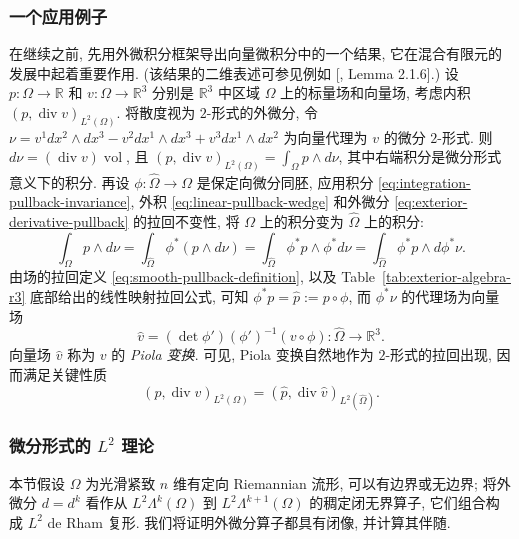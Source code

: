 \subsubsection{{一个应用例子}}\label{subsec:piola-application}

{在继续之前, 先用外微积分框架导出向量微积分中的一个结果, 它在混合有限元的发展中起着重要作用. (该结果的二维表述可参见例如 [, Lemma 2.1.6].) 设 $p:\Omega\to\mathbb R$ 和 $v:\Omega\to\mathbb R^3$ 分别是 $\mathbb R^3$ 中区域 $\Omega$ 上的标量场和向量场, 考虑内积 $(p,\operatorname{div}v)_{L^2(\Omega)}$. 将散度视为 $2$-形式的外微分, 令 $\nu=v^1dx^2\wedge dx^3-v^2dx^1\wedge dx^3+v^3dx^1\wedge dx^2$ 为向量代理为 $v$ 的微分 $2$-形式. 则 $d\nu=(\operatorname{div}v)\operatorname{vol}$, 且 $(p,\operatorname{div}v)_{L^2(\Omega)}=\int_\Omega p\wedge d\nu$, 其中右端积分是微分形式意义下的积分. 再设 $\phi:\widehat\Omega\to\Omega$ 是保定向微分同胚, 应用积分 \eqref{eq:integration-pullback-invariance}, 外积 \eqref{eq:linear-pullback-wedge} 和外微分 \eqref{eq:exterior-derivative-pullback} 的拉回不变性, 将 $\Omega$ 上的积分变为 $\widehat\Omega$ 上的积分:}
\[
\int_\Omega p\wedge d\nu=\int_{\widehat\Omega}\phi^*(p\wedge d\nu)=\int_{\widehat\Omega}\phi^*p\wedge\phi^*d\nu=\int_{\widehat\Omega}\phi^*p\wedge d\phi^*\nu.
\]
{由场的拉回定义 \eqref{eq:smooth-pullback-definition}, 以及 Table~\ref{tab:exterior-algebra-r3} 底部给出的线性映射拉回公式, 可知 $\phi^*p=\hat p:=p\circ\phi$, 而 $\phi^*\nu$ 的代理场为向量场}
\[
\hat v=(\det\phi')(\phi')^{-1}(v\circ\phi):\widehat\Omega\to\mathbb R^3.
\]
{向量场 $\hat v$ 称为 $v$ 的 \emph{Piola 变换}. 可见, Piola 变换自然地作为 $2$-形式的拉回出现, 因而满足关键性质}
\[
(p,\operatorname{div}v)_{L^2(\Omega)}=(\hat p,\operatorname{div}\hat v)_{L^2(\widehat\Omega)}.
\]

\subsubsection{{微分形式的 $L^2$ 理论}}\label{subsec:differential-forms-l2-theory}

{本节假设 $\Omega$ 为光滑紧致 $n$ 维有定向 Riemannian 流形, 可以有边界或无边界; 将外微分 $d=d^k$ 看作从 $L^2\Lambda^k(\Omega)$ 到 $L^2\Lambda^{k+1}(\Omega)$ 的稠定闭无界算子, 它们组合构成 $L^2$ de Rham 复形. 我们将证明外微分算子都具有闭像, 并计算其伴随.}

